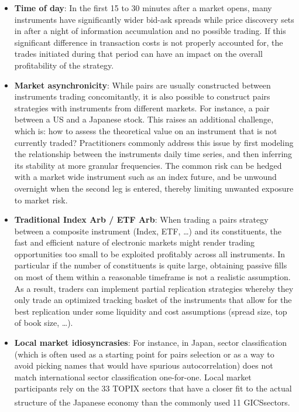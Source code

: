 \begin{itemize}
\item \textbf{Time of day}: In the first 15 to 30 minutes after a market opens, many instruments have significantly wider bid-ask spreads while price discovery sets in after a night of information accumulation and no possible trading. If this significant difference in transaction costs is not properly accounted for, the trades initiated during that period can have an impact on the overall profitability of the strategy.

\item \textbf{Market asynchronicity}: While pairs are usually constructed between instruments trading concomitantly, it is also possible to construct pairs strategies with instruments from different markets. For instance, a pair between a US and a Japanese stock. This raises an additional challenge, which is: how to assess the theoretical value on an instrument that is not currently traded? Practitioners commonly address this issue by first modeling the relationship between the instruments daily time series, and then inferring its stability at more granular frequencies. The common risk can be hedged with a market wide instrument such as an index future, and be unwound overnight when the second leg is entered, thereby limiting unwanted exposure to market risk.

\item \textbf{Traditional Index Arb / ETF Arb}: When trading a pairs strategy between a composite instrument (Index, ETF, \dots) and its constituents, the fast and efficient nature of electronic markets might render trading opportunities too small to be exploited profitably across all instruments. In particular if the number of constituents is quite large, obtaining passive fills on most of them within a reasonable timeframe is not a realistic assumption. As a result, traders can implement partial replication strategies whereby they only trade an optimized tracking basket of the instruments that allow for the best replication under some liquidity and cost assumptions (spread size, top of book size, \dots). 

\item \textbf{Local market idiosyncrasies}: For instance, in Japan, sector classification (which is often used as a starting point for pairs selection or as a way to avoid picking names that would have spurious autocorrelation) does not match international sector classification one-for-one. Local market participants rely on the 33 TOPIX sectors that have a closer fit to the actual structure of the Japanese economy than the commonly used 11 GICS\textsuperscript\textregistered sectors.


\end{itemize}
